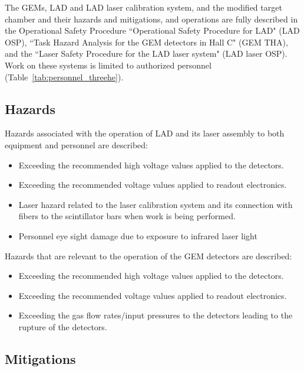 The GEMs, LAD and LAD laser calibration system, and the modified target chamber and their hazards and mitigations, and operations are fully described in the Operational Safety Procedure ``Operational Safety Procedure for LAD" (LAD OSP), ``Task Hazard Analysis for the GEM detectors in Hall C" (GEM THA), and the ``Laser Safety Procedure for the LAD laser system" (LAD laser OSP). Work on these
systems is limited to authorized personnel (Table~\ref{tab:personnel_threehe}).


\subsection{Hazards}
Hazards associated with the operation of LAD and its laser assembly to both equipment and personnel are described:
\begin{itemize}
\item Exceeding the recommended high voltage values applied to the detectors.
\item Exceeding the recommended voltage values applied to readout electronics. 
\item Laser hazard related to the laser calibration system and its connection with fibers to the scintillator bars when work is being performed. 
\item Personnel eye sight damage due to exposure to infrared laser light
\end{itemize}

Hazards that are relevant to the operation of the GEM detectors are described:
\begin{itemize}
\item Exceeding the recommended high voltage values applied to the detectors.
\item Exceeding the recommended voltage values applied to readout electronics. 
\item Exceeding the gas flow rates/input pressures to the detectors leading to the rupture of the detectors.
\end{itemize}

\subsection{Mitigations}

